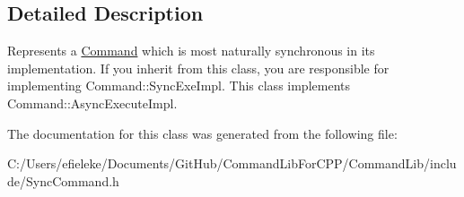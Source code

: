 \subsection{Detailed Description}
Represents a \mbox{\hyperlink{class_command_lib_1_1_command}{Command}} which is most naturally synchronous in its implementation. If you inherit from this class, you are responsible for implementing Command\+::\+Sync\+Exe\+Impl. This class implements Command\+::\+Async\+Execute\+Impl. 



The documentation for this class was generated from the following file\+:\begin{DoxyCompactItemize}
\item 
C\+:/\+Users/efieleke/\+Documents/\+Git\+Hub/\+Command\+Lib\+For\+C\+P\+P/\+Command\+Lib/include/Sync\+Command.\+h\end{DoxyCompactItemize}
